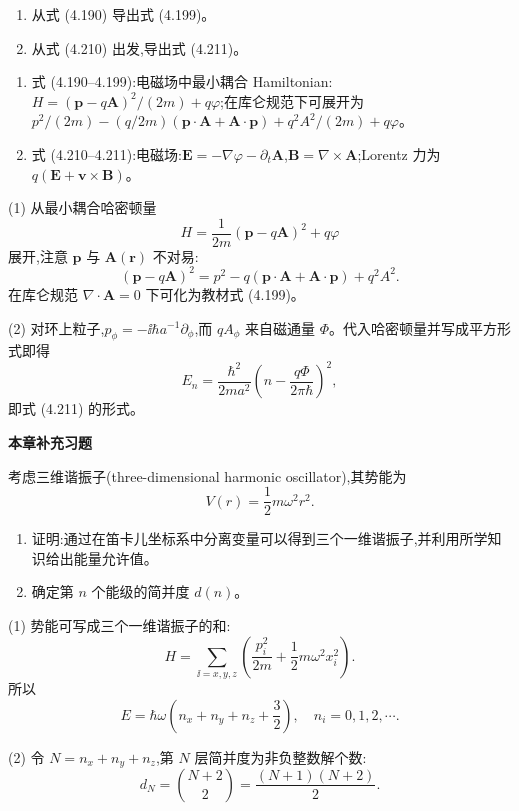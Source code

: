 \begin{question}
\begin{enumerate}
\item 从式 (4.190) 导出式 (4.199)。
\item 从式 (4.210) 出发,导出式 (4.211)。
\end{enumerate}

\par\smallskip
{}
\begin{enumerate}[leftmargin=2.2em,itemsep=0.12em,topsep=0.12em,parsep=0pt]
\item 式 (4.190--4.199):电磁场中最小耦合 Hamiltonian:$H=(\mathbf p-q\mathbf A)^2/(2m)+q\varphi$;在库仑规范下可展开为 $p^2/(2m)-(q/2m)(\mathbf p\cdot\mathbf A+\mathbf A\cdot\mathbf p)+q^2A^2/(2m)+q\varphi$。
\item 式 (4.210--4.211):电磁场:$\mathbf E=-\nabla\varphi-\partial_t\mathbf A$,$\mathbf B=\nabla\times\mathbf A$;Lorentz 力为 $q(\mathbf E+\mathbf v\times\mathbf B)$。
\end{enumerate}

\end{question}
\begin{solution}

(1) 从最小耦合哈密顿量
\[
H=\frac{1}{2m}(\mathbf p-q\mathbf A)^2+q\varphi
\]
展开,注意 $\mathbf p$ 与 $\mathbf A(\mathbf r)$ 不对易:
\[
(\mathbf p-q\mathbf A)^2=p^2-q(\mathbf p\cdot\mathbf A+
\mathbf A\cdot\mathbf p)+q^2A^2.
\]
在库仑规范 $\nabla\cdot\mathbf A=0$ 下可化为教材式 (4.199)。

(2) 对环上粒子,$p_\phi=-\ii\hbar a^{-1}\partial_\phi$,而 $qA_\phi$ 来自磁通量 $\Phi$。代入哈密顿量并写成平方形式即得
\[
E_n=\frac{\hbar^2}{2ma^2}\left(n-\frac{q\Phi}{2\pi\hbar}\right)^2,
\]
即式 (4.211) 的形式。

\end{solution}

\begin{center}\Large\bfseries 本章补充习题\end{center}

\begin{question}
考虑三维谐振子(three-dimensional harmonic oscillator),其势能为
\[
V(r)=\frac12m\omega^2r^2.
\]
\begin{enumerate}
\item 证明:通过在笛卡儿坐标系中分离变量可以得到三个一维谐振子,并利用所学知识给出能量允许值。
\item 确定第 $n$ 个能级的简并度 $d(n)$。
\end{enumerate}
\end{question}
\begin{solution}

(1) 势能可写成三个一维谐振子的和:
\[
H=\sum_{\ii=x,y,z}\left(\frac{p_i^2}{2m}+\frac12m\omega^2x_i^2\right).
\]
所以
\[
E=\hbar\omega\left(n_x+n_y+n_z+\frac32\right),
\quad n_i=0,1,2,\cdots.
\]

(2) 令 $N=n_x+n_y+n_z$,第 $N$ 层简并度为非负整数解个数:
\[
d_N=\binom{N+2}{2}=\frac{(N+1)(N+2)}{2}.
\]

\end{solution}

